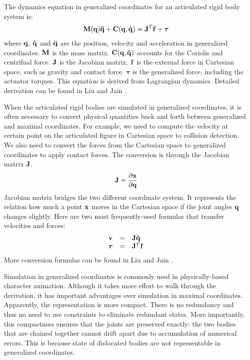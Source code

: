 The dynamics equation in generalized coordinates for an articulated rigid body system is:
\begin{equation}
  \vc{M}(\vc{q})\vc{\ddot{q}}+\vc{C(q,\dot{q})}=\vc{J}^T\vc{f}+\boldsymbol{\tau}
  \label{eq:generalized}
\end{equation}
where $\mathbf{q}$, $\mathbf{\dot{q}}$ and $\mathbf{\ddot{q}}$ are the position, velocity and acceleration in generalized coordinates. $\mathbf{M}$ is the mass matrix. $\mathbf{C(q,\dot{q})}$ accounts for the Coriolis and centrifual force. $\mathbf{J}$ is the Jacobian matrix. $\mathbf{f}$ is the external force in Cartesian space, such as gravity and contact force. $\boldsymbol{\tau}$ is the generalized force, including the actuator torques. This equation is derived from Lagrangian dynamics. Detailed derivation can be found in Liu and Jain \cite{Liu:2012:STM}.

When the articulated rigid bodies are simulated in generalized coordinates, it is often necessary to convert physical quantities back and forth between generalized and maximal coordinates. For example, we need to compute the velocity at certain point on the articulated figure in Cartesian space to collision detection. We also need to convert the forces from the Cartesian space to generalized coordinates to apply contact forces. The conversion is through the Jacobian matrix $\mathbf{J}$.
\begin{equation}
\mathbf{J}=\frac{\partial \mathbf{x}}{\partial \mathbf{q}}
\end{equation}
Jacobian matrix bridges the two different coordinate system. It represents the relation how much a point $\mathbf{x}$ moves in the Cartesian space if the joint angles $\mathbf{q}$ changes slightly. Here are two most frequently-used formulas that transfer velocities and forces:
\begin{displaymath}
  \begin{array}{lll}
    \mathbf{v} & = & \mathbf{J}\mathbf{\dot{q}}\\
    \boldsymbol{\tau} & = &\mathbf{J}^T\mathbf{f}
   \end{array}
\end{displaymath}
More conversion formulas can be found in Liu and Jain \cite{Liu:2012:STM}.

Simulation in generalized coordinates is commonly used in physically-based character animation. Although it takes more effort to walk through the derivation, it has important advantages over simulation in maximal coordinates. Apparently, the representation is more compact. There is no redundancy and thus no need to use constraints to eliminate redundant states. More importantly, this compactness ensures that the joints are preserved exactly: the two bodies that are chained together cannot drift apart due to accumulation of numerical errors. This is because state of dislocated bodies are not representable in generalized coordinates.

